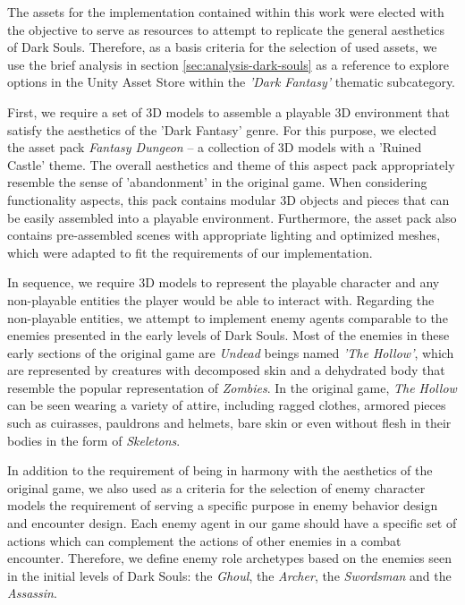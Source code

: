 The assets for the implementation contained within this work were elected with the objective to serve as resources to attempt to replicate the general aesthetics of Dark Souls. Therefore, as a basis criteria for the selection of used assets, we use the brief analysis in section \ref{sec:analysis-dark-souls} as a reference to explore options in the Unity Asset Store within the \emph{'Dark Fantasy'} thematic subcategory.

First, we require a set of 3D models to assemble a playable 3D environment that satisfy the aesthetics of the 'Dark Fantasy' genre. For this purpose, we elected the asset pack \emph{Fantasy Dungeon} -- a collection of 3D models with a 'Ruined Castle' theme. The overall aesthetics and theme of this aspect pack appropriately resemble the sense of 'abandonment' in the original game. When considering functionality aspects, this pack contains modular 3D objects and pieces that can be easily assembled into a playable environment. Furthermore, the asset pack also contains pre-assembled scenes with appropriate lighting and optimized meshes, which were adapted to fit the requirements of our implementation.




In sequence, we require 3D models to represent the playable character and any non-playable entities the player would be able to interact with. Regarding the non-playable entities, we attempt to implement enemy agents comparable to the enemies presented in the early levels of Dark Souls. Most of the enemies in these early sections of the original game are \emph{Undead} beings named \emph{'The Hollow'}, which are represented by creatures with decomposed skin and a dehydrated body that resemble the popular representation of \emph{Zombies}. In the original game, \emph{The Hollow} can be seen wearing a variety of attire, including ragged clothes, armored pieces such as cuirasses, pauldrons and helmets, bare skin or even without flesh in their bodies in the form of \emph{Skeletons}.

In addition to the requirement of being in harmony with the aesthetics of the original game, we also used as a criteria for the selection of enemy character models the requirement of serving a specific purpose in enemy behavior design and encounter design. Each enemy agent in our game should have a specific set of actions which can complement the actions of other enemies in a combat encounter. Therefore, we define enemy role archetypes based on the enemies seen in the initial levels of Dark Souls: the \emph{Ghoul}, the \emph{Archer}, the \emph{Swordsman} and the \emph{Assassin}.

